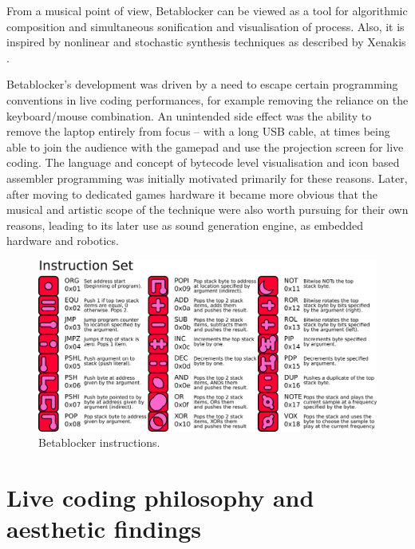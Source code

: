 \documentclass[letterpaper, 12pt]{article}
\begin{document}
From a musical point of view, Betablocker can be viewed as a tool for algorithmic composition \citep*{maurer1999-a-b} and simultaneous sonification and visualisation of process. Also, it is inspired by nonlinear and stochastic synthesis techniques as described by Xenakis \citep*{Xenakis:1971, luque2009-the}.

Betablocker's development was driven by a need to escape certain programming conventions in live coding performances, for example removing the reliance on the keyboard/mouse combination. An unintended side effect was the ability to remove the laptop entirely from focus -- with a long USB cable, at times being able to join the audience with the gamepad and use the projection screen for live coding. The language and concept of bytecode level visualisation and icon based assembler programming was initially motivated primarily for these reasons. Later, after moving to dedicated games hardware it became more obvious that the musical and artistic scope of the technique were also worth pursuing for their own reasons, leading to its later use as sound generation engine, as embedded hardware and robotics.

\begin{figure}
	\centering
		\includegraphics[width=13cm]{bbds-legend}
	\caption{Betablocker instructions.}
	\label{fig:fig_bbds-legend}
\end{figure}
\parskip 18pt


\section{Live coding philosophy and aesthetic findings}
\label{sec:distinct_character}

\end{document}
